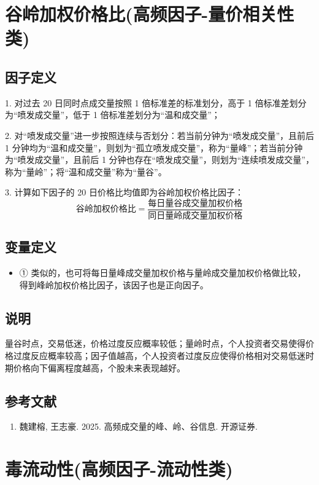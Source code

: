 \documentclass{article}
\begin{document}
\section{谷岭加权价格比(高频因子-量价相关性类)}

\subsection{因子定义}


1. 对过去 20 日同时点成交量按照 1 倍标准差的标准划分，高于 1 倍标准差划分为“喷发成交量”，低于 1 倍标准差划分为“温和成交量”；

2. 对“喷发成交量”进一步按照连续与否划分：若当前分钟为“喷发成交量”，且前后 1 分钟均为“温和成交量”，则划为“孤立喷发成交量”，称为“量峰”；若当前分钟为“喷发成交量”，且前后 1 分钟也存在“喷发成交量”，则划为“连续喷发成交量”，称为“量岭”；将“温和成交量”称为“量谷”。

3. 计算如下因子的 20 日价格比均值即为谷岭加权价格比因子：
\begin{equation}
    \text{谷岭加权价格比} = \frac{\text{每日量谷成交量加权价格}}{\text{同日量岭成交量加权价格}}
\end{equation}

\subsection{变量定义}
\begin{itemize}
    \item ① 类似的，也可将每日量峰成交量加权价格与量岭成交量加权价格做比较，得到峰岭加权价格比因子，该因子也是正向因子。
\end{itemize}

\subsection{说明}
量谷时点，交易低迷，价格过度反应概率较低；量岭时点，个人投资者交易使得价格过度反应概率较高；因子值越高，个人投资者过度反应使得价格相对交易低迷时期价格向下偏离程度越高，个股未来表现越好。

\subsection{参考文献}
\begin{enumerate}
    \item 魏建榕, 王志豪. 2025. 高频成交量的峰、岭、谷信息. 开源证券.
\end{enumerate}

\section{毒流动性(高频因子-流动性类)}
\end{document}
